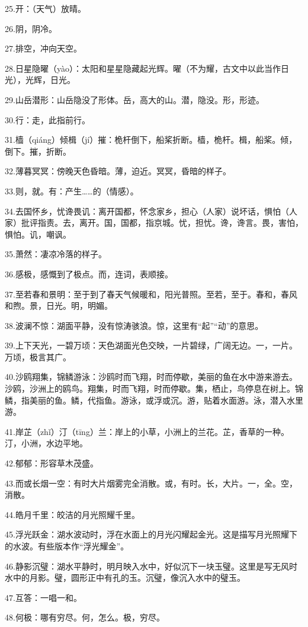 \documentclass[letterpaper,10pt,english]{sphinxmanual}
\begin{document}
25.开：（天气）放晴。

26.阴，阴冷。

27.排空，冲向天空。

28.日星隐曜（yào）：太阳和星星隐藏起光辉。曜（不为耀，古文中以此当作日光），光辉，日光。

29.山岳潜形：山岳隐没了形体。岳，高大的山。潜，隐没。形，形迹。

30.行：走，此指前行。

31.樯（qiáng）倾楫（jí）摧：桅杆倒下，船桨折断。樯，桅杆。楫，船桨。倾，倒下。摧，折断。

32.薄暮冥冥：傍晚天色昏暗。薄，迫近。冥冥，昏暗的样子。

33.则，就。有：产生……的（情感）。

34.去国怀乡，忧谗畏讥：离开国都，怀念家乡，担心（人家）说坏话，惧怕（人家）批评指责。去，离开。国，国都，指京城。忧，担忧。谗，谗言。畏，害怕，惧怕。讥，嘲讽。

35.萧然：凄凉冷落的样子。

36.感极，感慨到了极点。而，连词，表顺接。

37.至若春和景明：至于到了春天气候暖和，阳光普照。至若，至于。春和，春风和煦。景，日光。明，明媚。

38.波澜不惊：湖面平静，没有惊涛骇浪。惊，这里有“起”“动”的意思。

39.上下天光，一碧万顷：天色湖面光色交映，一片碧绿，广阔无边。一，一片。万顷，极言其广。

40.沙鸥翔集，锦鳞游泳：沙鸥时而飞翔，时而停歇，美丽的鱼在水中游来游去。沙鸥，沙洲上的鸥鸟。翔集，时而飞翔，时而停歇。集，栖止，鸟停息在树上。锦鳞，指美丽的鱼。鳞，代指鱼。游泳，或浮或沉。游，贴着水面游。泳，潜入水里游。

41.岸芷（zhǐ）汀（tīng）兰：岸上的小草，小洲上的兰花。芷，香草的一种。汀，小洲，水边平地。

42.郁郁：形容草木茂盛。

43.而或长烟一空：有时大片烟雾完全消散。或，有时。长，大片。一，全。空，消散。

44.皓月千里：皎洁的月光照耀千里。

45.浮光跃金：湖水波动时，浮在水面上的月光闪耀起金光。这是描写月光照耀下的水波。有些版本作“浮光耀金”。

46.静影沉璧：湖水平静时，明月映入水中，好似沉下一块玉璧。这里是写无风时水中的月影。璧，圆形正中有孔的玉。沉璧，像沉入水中的璧玉。

47.互答：一唱一和。

48.何极：哪有穷尽。何，怎么。极，穷尽。
\end{document}
